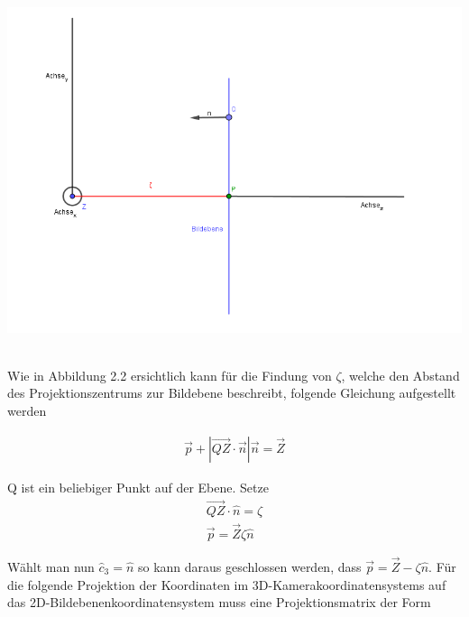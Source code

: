 	\begin{minipage}{\linewidth}
	\centering
	\includegraphics[width=1.\linewidth]{images/ZetaHerleitung.png}
\end{minipage}\\

Wie in Abbildung 2.2 ersichtlich kann für die Findung von $\zeta$, welche den Abstand des Projektionszentrums zur Bildebene beschreibt, folgende Gleichung aufgestellt werden
		
		\begin{gather}
		\vec{p}+|\vec{QZ} \cdot \vec{n}|\vec{n} = \vec{Z}
		\end{gather}
		
		Q ist ein beliebiger Punkt auf der Ebene. Setze
		\begin{gather}
		\vec{QZ} \cdot \hat{n} = \zeta\\
		\vec{p}= \vec{Z}\zeta \hat{n}
		\end{gather}
		
		Wählt man nun  $\hat{c}_3 = \hat{n}$ so kann daraus geschlossen werden, dass $\vec{p} = \vec{Z} - \zeta \hat{n}$. Für die folgende Projektion der Koordinaten im 3D-Kamerakoordinatensystems auf das 2D-Bildebenenkoordinatensystem muss eine Projektionsmatrix der Form		
		
